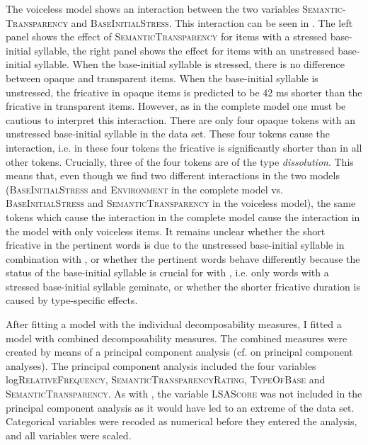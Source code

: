 The voiceless model shows an interaction between the two variables \textsc{Semantic-Transparency} and \textsc{BaseInitialStress}. This interaction can be seen in . The left panel shows the effect of \textsc{SemanticTransparency} for items with a stressed base-initial syllable, the right panel shows the effect for items with an unstressed base-initial syllable. When the base-initial syllable is stressed, there is no difference between opaque and transparent items. When the base-initial syllable is unstressed, the fricative in opaque items is predicted to be 42 ms shorter than the fricative in transparent items. However, as in the complete model one must be cautious to  interpret this interaction. There are only four opaque tokens with an unstressed base-initial syllable in the data set. These four tokens cause the interaction, i.e. in these four tokens the fricative is significantly shorter than in all other tokens. 
Crucially, three of the four tokens are of the type \textit{dissolution}. This means that, even though we find two different interactions in the two models (\textsc{BaseInitialStress} and \textsc{Environment} in the complete model vs. \textsc{BaseInitialStress} and \textsc{SemanticTransparency} in the voiceless model), the same tokens which cause the interaction in the complete model cause the interaction in the model with only voiceless items. It remains unclear whether the short fricative in the pertinent words is due to the unstressed base-initial syllable in combination with , or whether the pertinent words behave differently because the  status of the base-initial syllable is crucial for  with , i.e. only words with a stressed base-initial syllable geminate, or whether the shorter fricative duration is caused by type-specific effects. 



After fitting a model with the individual decomposability measures, I fitted a model with combined decomposability measures. The combined measures were created by means of a principal component analysis (cf.  on principal component analyses). 
The principal component analysis included the four variables log\textsc{RelativeFrequency}, \textsc{SemanticTransparencyRating}, \textsc{TypeOfBase} and \textsc{SemanticTransparency}. As with , the variable \textsc{LSAScore} was not included in the principal component analysis as it would have led to an extreme  of the data set. Categorical variables were recoded as numerical before they entered the analysis, and all variables were scaled.




